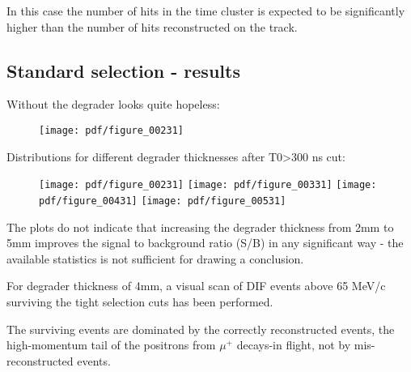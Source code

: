In this case the number of hits in the time cluster is expected to be significantly higher
than the number of hits reconstructed on the track.

\subsection{Standard selection - results}

Without the degrader looks quite hopeless:

\begin{figure}[H]
  \texttt{[image: pdf/figure\_00231]}
  \caption{
    \label{fig:deg_3mm_mom}
  }
\end{figure}

Distributions for different degrader thicknesses after T0>300 ns cut:

\begin{figure}[H]
  \texttt{[image: pdf/figure\_00231]}
  \texttt{[image: pdf/figure\_00331]}
  \texttt{[image: pdf/figure\_00431]}
  \texttt{[image: pdf/figure\_00531]}
  \caption{
    \label{fig:deg_3mm_mom}
  }
\end{figure}

The plots do not indicate that increasing the degrader thickness from 2mm to 5mm 
improves  the signal to background ratio (S/B) in any significant way - the available
statistics is not sufficient for drawing a conclusion.

For degrader thickness of 4mm, a visual scan of DIF events above 65 MeV/c surviving
the tight selection cuts has been performed.

The surviving events are dominated by the correctly reconstructed events,
the high-momentum tail of the positrons from $\mu^+$ decays-in flight,
not by mis-reconstructed events.

